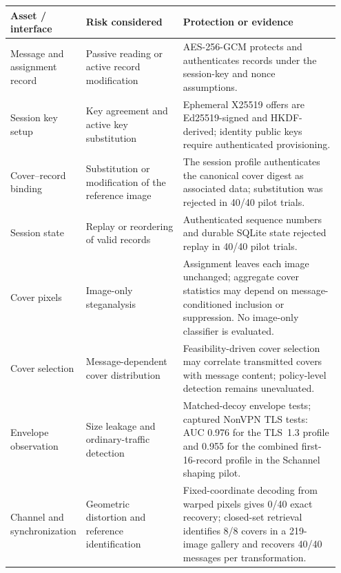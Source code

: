 \begin{tabular}{p{0.16\linewidth}p{0.30\linewidth}p{0.49\linewidth}}
\toprule
\textbf{Asset / interface} & \textbf{Risk considered} & \textbf{Protection or evidence} \\
\midrule
Message and assignment record & Passive reading or active record modification & AES-256-GCM protects and authenticates records under the session-key and nonce assumptions. \\
Session key setup & Key agreement and active key substitution & Ephemeral X25519 offers are Ed25519-signed and HKDF-derived; identity public keys require authenticated provisioning. \\
Cover--record binding & Substitution or modification of the reference image & The session profile authenticates the canonical cover digest as associated data; substitution was rejected in 40/40 pilot trials. \\
Session state & Replay or reordering of valid records & Authenticated sequence numbers and durable SQLite state rejected replay in 40/40 pilot trials. \\
Cover pixels & Image-only steganalysis & Assignment leaves each image unchanged; aggregate cover statistics may depend on message-conditioned inclusion or suppression. No image-only classifier is evaluated. \\
Cover selection & Message-dependent cover distribution & Feasibility-driven cover selection may correlate transmitted covers with message content; policy-level detection remains unevaluated. \\
Envelope observation & Size leakage and ordinary-traffic detection & Matched-decoy envelope tests; captured NonVPN TLS tests: AUC 0.976 for the TLS~1.3 profile and 0.955 for the combined first-16-record profile in the Schannel shaping pilot. \\
Channel and synchronization & Geometric distortion and reference identification & Fixed-coordinate decoding from warped pixels gives 0/40 exact recovery; closed-set retrieval identifies 8/8 covers in a 219-image gallery and recovers 40/40 messages per transformation. \\
\bottomrule
\end{tabular}
